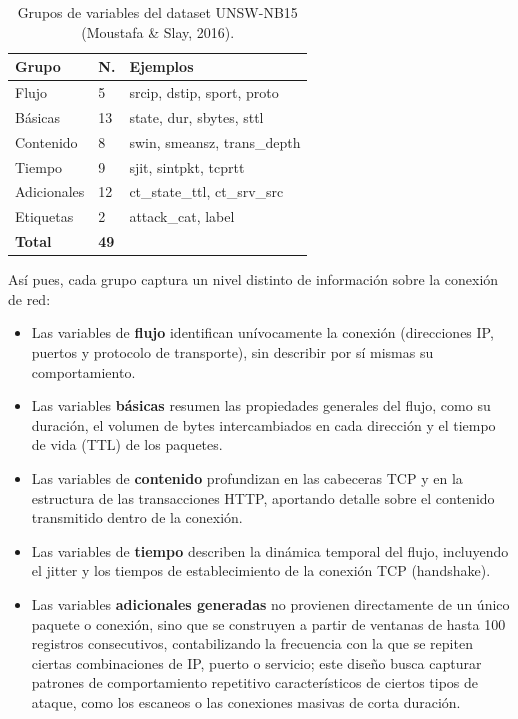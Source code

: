 \documentclass[conference]{IEEEtran}
\begin{document}
\FloatBarrier

\begin{table}[H]
\centering
\caption{Grupos de variables del dataset UNSW-NB15 (Moustafa \& 
Slay, 2016).}
\label{tab:grupos_variables}
\footnotesize
\begin{tabular}{@{}p{1.6cm}p{0.7cm}p{4.3cm}@{}}
\hline
\textbf{Grupo} & \textbf{N.} & \textbf{Ejemplos} \\
\hline
Flujo & 5 & srcip, dstip, sport, proto \\
Básicas & 13 & state, dur, sbytes, sttl \\
Contenido & 8 & swin, smeansz, trans\_depth \\
Tiempo & 9 & sjit, sintpkt, tcprtt \\
Adicionales & 12 & ct\_state\_ttl, ct\_srv\_src \\
\hline
Etiquetas & 2 & attack\_cat, label \\
\hline
\textbf{Total} & \textbf{49} & \\
\hline
\end{tabular}
\end{table}

Así pues, cada grupo captura un nivel distinto de información sobre 
la conexión de red:

\begin{itemize}
    \item Las variables de \textbf{flujo} identifican unívocamente 
    la conexión (direcciones IP, puertos y protocolo de transporte), 
    sin describir por sí mismas su comportamiento.
    \item Las variables \textbf{básicas} resumen las propiedades 
    generales del flujo, como su duración, el volumen de bytes 
    intercambiados en cada dirección y el tiempo de vida (TTL) de 
    los paquetes.
    \item Las variables de \textbf{contenido} profundizan en las 
    cabeceras TCP y en la estructura de las transacciones HTTP, 
    aportando detalle sobre el contenido transmitido dentro de la 
    conexión.
    \item Las variables de \textbf{tiempo} describen la dinámica 
    temporal del flujo, incluyendo el jitter y los tiempos de 
    establecimiento de la conexión TCP (handshake).
    \item Las variables \textbf{adicionales generadas} no provienen 
    directamente de un único paquete o conexión, sino que se 
    construyen a partir de ventanas de hasta 100 registros 
    consecutivos, contabilizando la frecuencia con la que se repiten 
    ciertas combinaciones de IP, puerto o servicio; este diseño 
    busca capturar patrones de comportamiento repetitivo 
    característicos de ciertos tipos de ataque, como los escaneos o 
    las conexiones masivas de corta duración.
\end{itemize}
\end{document}
